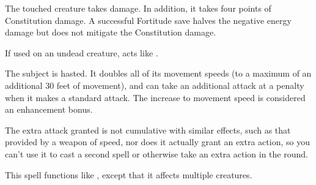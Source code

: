 \spellrng{\rngtouch}
\begin{spelleffect}
  The touched creature takes damage. In addition, it takes four points of Constitution damage. A successful Fortitude save halves the negative energy damage but does not mitigate the Constitution damage.
\end{spelleffect}
\begin{spellnotes}
  If used on an undead creature,  acts like .
\end{spellnotes}

\spelldur{\durshort}
\begin{spelleffect}
  The subject is hasted. It doubles all of its movement speeds (to a maximum of an additional 30 feet of movement), and can take an additional attack at a  penalty when it makes a standard attack. The increase to movement speed is considered an enhancement bonus.
\end{spelleffect}
\begin{spellnotes}
    The extra attack granted is not cumulative with similar effects, such as that provided by a weapon of speed, nor does it actually grant an extra action, so you can't use it to cast a second spell or otherwise take an extra action in the round.
\end{spellnotes}

\begin{spelleffect}
  This spell functions like , except that it affects multiple creatures.
\end{spelleffect}

